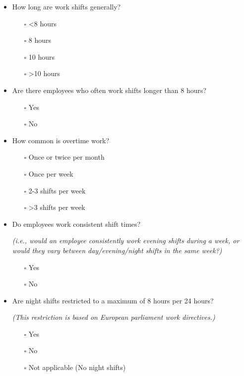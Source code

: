 \documentclass[
  12pt,
]{scrbook}
\providecommand{\tightlist}{%
  \setlength{\itemsep}{0pt}\setlength{\parskip}{0pt}}
\begin{document}
\begin{itemize}
\item
  How long are work shifts generally?

  \begin{itemize}
  \tightlist
  \item[$\square$]
    \textless8 hours
  \item[$\square$]
    8 hours
  \item[$\square$]
    10 hours
  \item[$\square$]
    \textgreater10 hours
  \end{itemize}
\item
  Are there employees who often work shifts longer than 8 hours?

  \begin{itemize}
  \tightlist
  \item[$\square$]
    Yes
  \item[$\square$]
    No
  \end{itemize}
\item
  How common is overtime work?

  \begin{itemize}
  \tightlist
  \item[$\square$]
    Once or twice per month
  \item[$\square$]
    Once per week
  \item[$\square$]
    2-3 shifts per week
  \item[$\square$]
    \textgreater3 shifts per week
  \end{itemize}
\item
  Do employees work consistent shift times?

  \emph{(i.e., would an employee consistently work evening shifts during a week, or would they vary between day/evening/night shifts in the same week?)}

  \begin{itemize}
  \tightlist
  \item[$\square$]
    Yes
  \item[$\square$]
    No
  \end{itemize}
\item
  Are night shifts restricted to a maximum of 8 hours per 24 hours?

  \emph{(This restriction is based on European parliament work directives.)}

  \begin{itemize}
  \tightlist
  \item[$\square$]
    Yes
  \item[$\square$]
    No
  \item[$\square$]
    Not applicable (No night shifts)
  \end{itemize}
\end{itemize}
\end{document}
